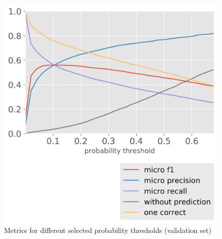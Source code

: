 \begin{figure}[t]
\centering
\includegraphics[width=.49\textwidth]{figures/research-fields/fields-precision-recall.png}
    \caption{Metrics for different selected probability thresholds (validation set)}
\label{fig:fields_precision_recall}
\end{figure}


